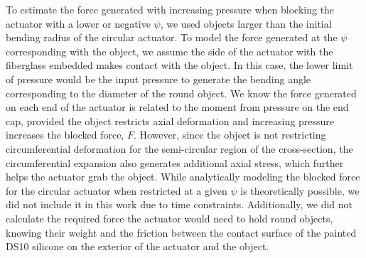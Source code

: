 To estimate the force generated with increasing pressure when blocking the actuator with a lower or negative $\psi$, we used objects larger than the initial bending radius of the circular actuator. To model the force generated at the $\psi$ corresponding with the object, we assume the side of the actuator with the fiberglass embedded makes contact with the object. In this case, the lower limit of pressure would be the input pressure to generate the bending angle corresponding to the diameter of the round object. We know the force generated on each end of the actuator is related to the moment from pressure on the end cap, provided the object restricts axial deformation and increasing pressure increases the blocked force, $F$. However, since the object is not restricting circumferential deformation for the semi-circular region of the cross-section, the circumferential expansion also generates additional axial stress, which further helps the actuator grab the object. While analytically modeling the blocked force for the circular actuator when restricted at a given $\psi$ is theoretically possible, we did not include it in this work due to time constraints. Additionally, we did not calculate the required force the actuator would need to hold round objects, knowing their weight and the friction between the contact surface of the painted DS10 silicone on the exterior of the actuator and the object. 